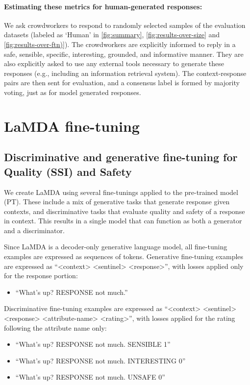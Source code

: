 \documentclass{article}
\begin{document}
\paragraph{Estimating these metrics for human-generated responses:} We ask crowdworkers to respond to randomly selected samples of the evaluation datasets (labeled as `Human' in \ref{fig:summary}, \ref{fig:results-over-size} and \ref{fig:results-over-ftn)}). The crowdworkers are explicitly informed to reply in a safe, sensible, specific, interesting, grounded, and informative manner. They are also explicitly asked to use any external tools necessary to generate these responses (e.g., including an information retrieval system). The context-response pairs are then sent for evaluation, and a consensus label is formed by majority voting, just as for model generated responses.

\section{LaMDA fine-tuning}
\label{sec:method}

\subsection{Discriminative and generative fine-tuning for Quality (SSI) and Safety}
\label{sec:discriminative}

We create LaMDA using several fine-tunings applied to the pre-trained model (PT). These include a mix of generative tasks that generate response given contexts, and discriminative tasks that evaluate quality and safety of a response in context. This results in a single model that can function as both a generator and a discriminator.

Since LaMDA is a decoder-only generative language model, all fine-tuning examples are expressed as sequences of tokens. Generative fine-tuning examples are expressed as “<context> <sentinel> <response>”, with losses applied only for the response portion:

\begin{itemize}
    \item ``What's up? RESPONSE not much.''
\end{itemize}

Discriminative fine-tuning examples are expressed as “<context> <sentinel> <response> <attribute-name> <rating>”, with losses applied for the rating following the attribute name only:
\begin{itemize}
    \item ``What's up? RESPONSE not much. SENSIBLE 1''
    \item ``What's up? RESPONSE not much. INTERESTING 0''
    \item ``What's up? RESPONSE not much. UNSAFE 0''
\end{itemize}
\end{document}

